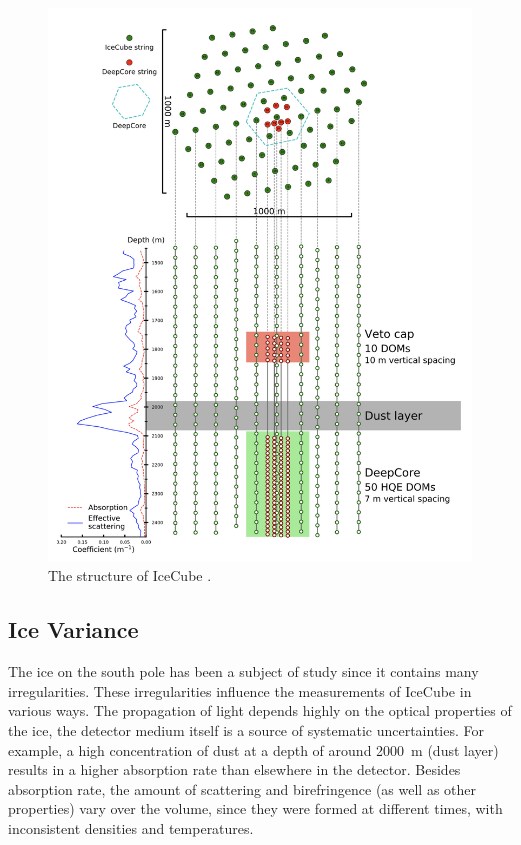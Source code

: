 \documentclass[a4paper,10pt]{scrartcl}
\begin{document}
\begin{figure}[h]
    \includegraphics[scale=0.6]{images/icecube.png}
    \centering
    \caption{The structure of IceCube \cite{left}.}
    \label{fig:icecube}
\end{figure}

\subsection{Ice Variance}

The ice on the south pole has been a subject of study since it contains many irregularities.
These irregularities influence the measurements of IceCube in various ways.
The propagation of light depends highly on the optical properties of the ice, the detector medium itself is a source of systematic uncertainties.
For example, a high concentration of dust at a depth of around \SI{2000}{m} (dust layer) results in a higher absorption rate than elsewhere in the detector.
Besides absorption rate, the amount of scattering and birefringence (as well as other properties) vary over the volume, since they were formed at different times, with inconsistent densities and temperatures.
\end{document}
